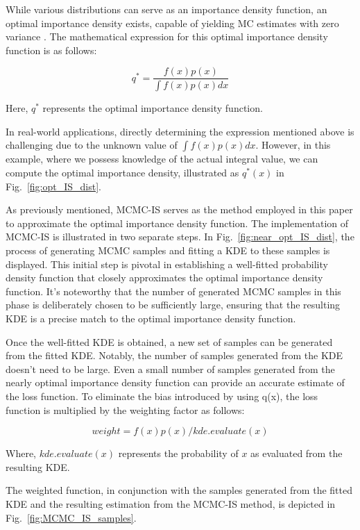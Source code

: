     While various distributions can serve as an importance density function, an optimal importance density exists, capable of yielding MC estimates with zero variance \cite{asmussen_stochastic_2007}. The mathematical expression for this optimal importance density function is as follows:
    
    $$q^*=\frac{f(x)p(x)}{\int f(x)p(x)dx}$$

    Here, $q^{*}$ represents the optimal importance density function.

    In real-world applications, directly determining the expression mentioned above is challenging due to the unknown value of $\int{f(x)}{p(x)}dx$. However, in this example, where we possess knowledge of the actual integral value, we can compute the optimal importance density, illustrated as $q^*(x)$ in Fig.~\ref{fig:opt_IS_dist}.

    
    
    As previously mentioned, MCMC-IS serves as the method employed in this paper to approximate the optimal importance density function. The implementation of MCMC-IS is illustrated in two separate steps. In Fig.~\ref{fig:near_opt_IS_dist}, the process of generating MCMC samples and fitting a KDE to these samples is displayed. This initial step is pivotal in establishing a well-fitted probability density function that closely approximates the optimal importance density function. It's noteworthy that the number of generated MCMC samples in this phase is deliberately chosen to be sufficiently large, ensuring that the resulting KDE is a precise match to the optimal importance density function.

    

    Once the well-fitted KDE is obtained, a new set of samples can be generated from the fitted KDE. Notably, the number of samples generated from the KDE doesn't need to be large. Even a small number of samples generated from the nearly optimal importance density function can provide an accurate estimate of the loss function. To eliminate the bias introduced by using q(x), the loss function is multiplied by the weighting factor as follows:

    $$weight=f(x)p(x)/kde.evaluate(x)$$

    Where, $kde.evaluate(x)$ represents the probability of $x$ as evaluated from the resulting KDE.
    
    The weighted function, in conjunction with the samples generated from the fitted KDE and the resulting estimation from the MCMC-IS method, is depicted in Fig.~\ref{fig:MCMC_IS_samples}.
    
